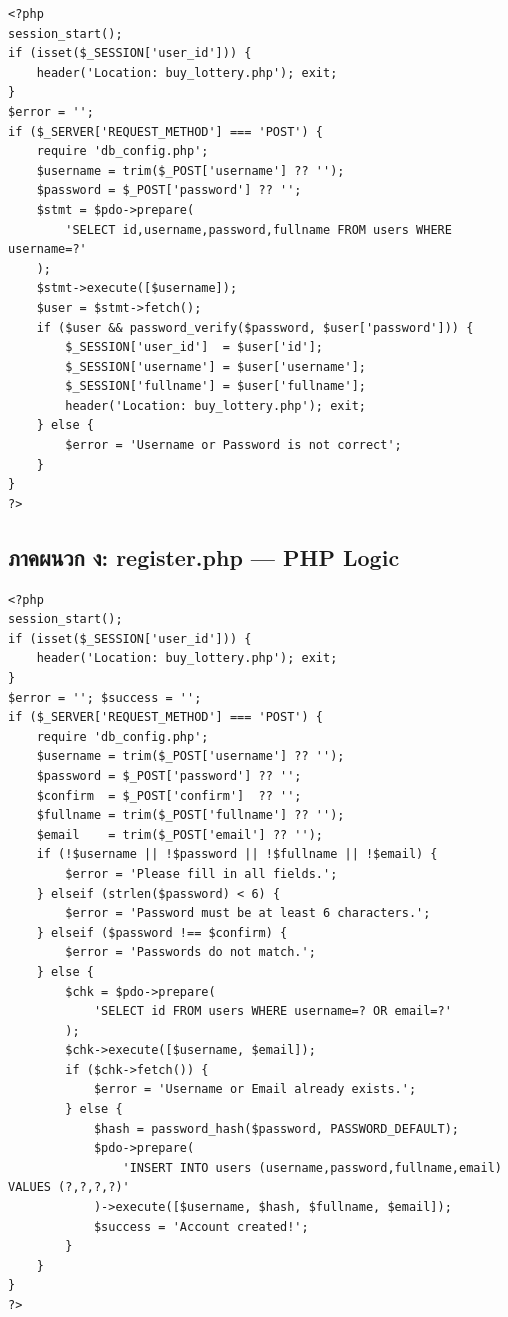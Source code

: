\documentclass[a4paper,12pt]{article}
\begin{document}
\begin{lstlisting}[style=phpstyle, caption={index.php}]
<?php
session_start();
if (isset($_SESSION['user_id'])) {
    header('Location: buy_lottery.php'); exit;
}
$error = '';
if ($_SERVER['REQUEST_METHOD'] === 'POST') {
    require 'db_config.php';
    $username = trim($_POST['username'] ?? '');
    $password = $_POST['password'] ?? '';
    $stmt = $pdo->prepare(
        'SELECT id,username,password,fullname FROM users WHERE username=?'
    );
    $stmt->execute([$username]);
    $user = $stmt->fetch();
    if ($user && password_verify($password, $user['password'])) {
        $_SESSION['user_id']  = $user['id'];
        $_SESSION['username'] = $user['username'];
        $_SESSION['fullname'] = $user['fullname'];
        header('Location: buy_lottery.php'); exit;
    } else {
        $error = 'Username or Password is not correct';
    }
}
?>
\end{lstlisting}

\newpage

\subsection*{ภาคผนวก ง: register.php --- PHP Logic}

\begin{lstlisting}[style=phpstyle, caption={register.php}]
<?php
session_start();
if (isset($_SESSION['user_id'])) {
    header('Location: buy_lottery.php'); exit;
}
$error = ''; $success = '';
if ($_SERVER['REQUEST_METHOD'] === 'POST') {
    require 'db_config.php';
    $username = trim($_POST['username'] ?? '');
    $password = $_POST['password'] ?? '';
    $confirm  = $_POST['confirm']  ?? '';
    $fullname = trim($_POST['fullname'] ?? '');
    $email    = trim($_POST['email'] ?? '');
    if (!$username || !$password || !$fullname || !$email) {
        $error = 'Please fill in all fields.';
    } elseif (strlen($password) < 6) {
        $error = 'Password must be at least 6 characters.';
    } elseif ($password !== $confirm) {
        $error = 'Passwords do not match.';
    } else {
        $chk = $pdo->prepare(
            'SELECT id FROM users WHERE username=? OR email=?'
        );
        $chk->execute([$username, $email]);
        if ($chk->fetch()) {
            $error = 'Username or Email already exists.';
        } else {
            $hash = password_hash($password, PASSWORD_DEFAULT);
            $pdo->prepare(
                'INSERT INTO users (username,password,fullname,email) VALUES (?,?,?,?)'
            )->execute([$username, $hash, $fullname, $email]);
            $success = 'Account created!';
        }
    }
}
?>
\end{lstlisting}
\end{document}
